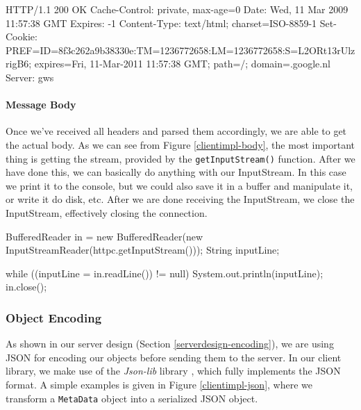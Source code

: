 \begin{figure*}[ht] %
\begin{center}
\begin{code}
HTTP/1.1 200 OK
Cache-Control: private, max-age=0
Date: Wed, 11 Mar 2009 11:57:38 GMT
Expires: -1
Content-Type: text/html; charset=ISO-8859-1
Set-Cookie: 
  PREF=ID=8f3c262a9b38330e:TM=1236772658:LM=1236772658:S=L2ORt13rUlzrigB6; 
  expires=Fri, 11-Mar-2011 11:57:38 GMT; path=/; domain=.google.nl
Server: gws
\end{code}
\caption{An HTTP response including cookies.\label{clientimpl-cookies-resp}}
\end{center}
\end{figure*}

\paragraph{Message Body}
Once we've received all headers and parsed them accordingly, we are able to get
the actual body. As we can see from Figure \ref{clientimpl-body}, the most
important thing is getting the stream, provided by the \texttt{getInputStream()}
function. After we have done this, we can basically do anything with our
InputStream. In this case we print it to the console, but we could also save it
in a buffer and manipulate it, or write it do disk, etc. After we are done
receiving the InputStream, we close the InputStream, effectively closing the
connection.

\begin{figure*}[ht] %
\begin{center}
\begin{code}
BufferedReader in = 
  new BufferedReader(new InputStreamReader(httpc.getInputStream()));
String inputLine;

while ((inputLine = in.readLine()) != null) {
    System.out.println(inputLine);
}
in.close();
\end{code}
\caption{Retrieving the HTTP response's body.\label{clientimpl-body}}
\end{center}
\end{figure*}

\subsubsection{Object Encoding}
\label{clientimpl-encoding}
As shown in our server design (Section \ref{serverdesign-encoding}), we are using
JSON for encoding our objects before sending them to the server. In our client
library, we make use of the \emph{Json-lib} library \cite{json-lib-www}, which
fully implements the JSON format. A simple examples is given in Figure
\ref{clientimpl-json}, where we transform a \texttt{MetaData} object into a
serialized JSON object.

